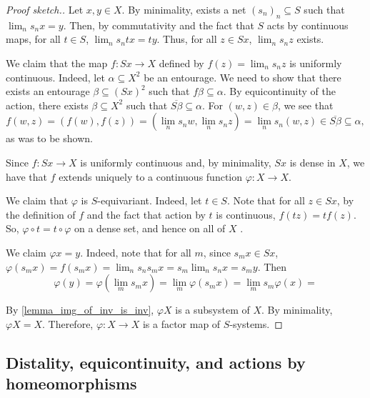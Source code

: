 
\begin{proof}[Proof sketch.]
    Let $x, y \in X$.  By minimality, exists a net $(s_n)_n \subseteq S$ such that $\lim_n s_n x = y$.  Then, by commutativity and the fact that $S$ acts by continuous maps, for all $t \in S$, $\lim_n s_n tx = ty$.  Thus, for all $z \in Sx$, $\lim_n s_n z$ exists.

    We claim that the map $f: Sx \to X$ defined by $f(z) = \lim_n s_n z$ is uniformly continuous. Indeed, let $\alpha \subseteq X^2$ be an entourage.  We need to show that there exists an entourage $\beta \subseteq (Sx)^2$ such that $f \beta \subseteq \alpha$.  By equicontinuity of the action, there exists $\beta \subseteq X^2$ such that $\overline{S \beta} \subseteq \alpha$. For $(w,z) \in \beta$, we see that
    \[f(w,z) = (f(w),f(z)) = (\lim_n s_n w, \lim_n s_n z) = \lim_n s_n (w,z) \in \overline{S\beta} \subseteq \alpha,\]
    as was to be shown.

    Since $f: Sx \to X$ is uniformly continuous and, by minimality, $Sx$ is dense in $X$, we have that $f$ extends uniquely to a continuous function $\varphi: X \to X$.

    We claim that $\varphi$ is $S$-equivariant.  Indeed, let $t \in S$.  Note that for all $z \in Sx$, by the definition of $f$ and the fact that action by $t$ is continuous, $f(tz) = t f(z)$.  So, $\varphi \circ t = t \circ \varphi$ on a dense set, and hence on all of $X$ .
    
    We claim $\varphi x = y$. Indeed, note that for all $m$, since $s_m x \in Sx$, $\varphi(s_m x) = f(s_m x) = \lim_{n} s_n s_m x = s_m \lim_n s_n x = s_m y$.  Then
    \[\varphi(y) = \varphi(\lim_m s_m x) = \lim_m \varphi(s_m x) = \lim_m s_m \varphi (x) = \]
    
    By \cref{lemma_img_of_inv_is_inv}, $\varphi X$ is a subsystem of $X$.  By minimality, $\varphi X = X$.  Therefore, $\varphi: X \to X$ is a factor map of $S$-systems.
\end{proof}

\subsection{Distality, equicontinuity, and actions by homeomorphisms}

